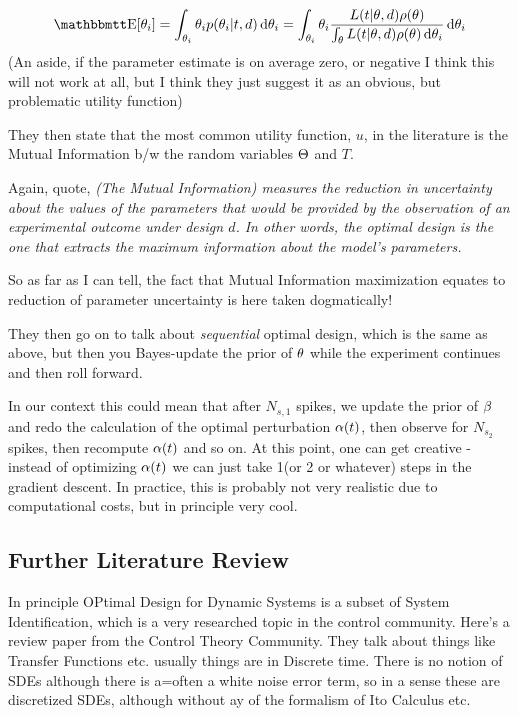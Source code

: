 $$
\Exp[\th_i] = \int_{\th_i} \th_i p(\th_i| t, d) \intd{\th_i} = 
\int_{\th_i} \th_i \frac{ L(t| \th, d) \rho (\th) }
					    {\int_\th L(t| \th, d) \rho (\th)\intd{\th_i} } \intd{\th_i} 
$$
(An aside, if the parameter estimate is on average zero, or negative I think
this will not work at all, but I think they just suggest it as an obvious, but
problematic utility function)

They then state that the most common utility function, $u$, in the
literature is the Mutual Information b/w the random variables ${\Theta}$ and $T$. 

Again, quote, {\sl (The Mutual Information)  measures the reduction in
uncertainty about the values of the parameters that would be provided by the
observation of an experimental outcome under design $d$. In other words, the
optimal design is the one that extracts the maximum information about the
model's parameters.}

So as far as I can tell, the fact that Mutual Information maximization equates
to reduction of parameter uncertainty is here taken dogmatically!

They then go on to talk about { \sl sequential } optimal design, which is the
same as above, but then you Bayes-update the prior of ${ \theta}$ while the experiment
continues and then roll forward. 

In our context this could mean that after $N_{s,1}$ spikes, we update the prior
of $\beta$ and redo the calculation of the optimal perturbation $\alpha(t)$, then
observe for $N_{s_2}$ spikes, then recompute $\alpha(t)$ and so on. At this point,
one can get creative - instead of optimizing $\alpha(t)$ we can just take 1(or 2 or
whatever) steps in the gradient descent. In practice, this is probably
not very realistic due to computational costs, but in principle very cool.

\subsection{Further Literature Review}	
In principle OPtimal Design for Dynamic Systems is a subset of System
Identification, which is a very researched topic in the control community.
Here's a review paper \cite{Gevers2011} from the Control Theory Community. 
They talk about things like Transfer Functions etc. usually things are in
Discrete time. There is no notion of SDEs although there is a=often a white
noise error term, so in a sense these are discretized SDEs, although without ay
of the formalism of Ito Calculus etc. 

